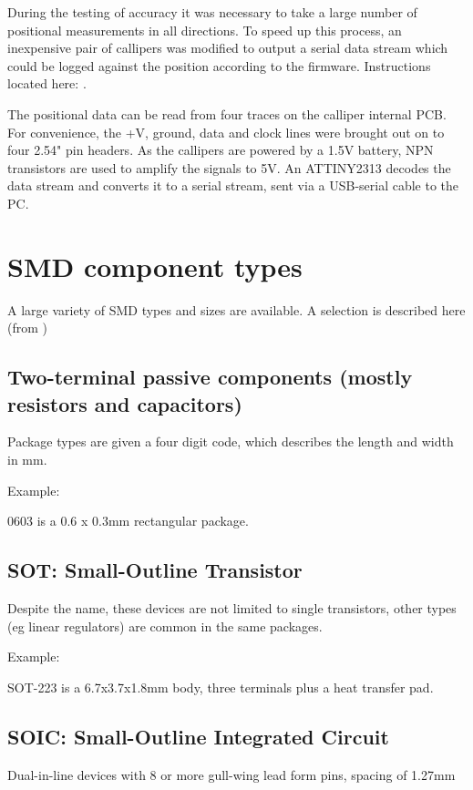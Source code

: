 During the testing of accuracy it was necessary to take a large number of positional measurements in all directions. 
To speed up this process, an inexpensive pair of callipers was modified to output a serial data stream which could be logged
against the position according to the firmware. Instructions located here: \cite{caliperdata}.

The positional data can be read from four traces on the calliper internal PCB. For convenience, the +V, ground, data and clock lines
were brought out on to four 2.54" pin headers. As the callipers are powered by a 1.5V battery, NPN transistors are used to amplify the signals to 5V. An ATTINY2313
decodes the data stream and converts it to a serial stream, sent via a USB-serial cable to the PC.

\newpage
\section{SMD component types}

A large variety of SMD types and sizes are available. A selection is described here (from \cite{smdwiki})

\subsection{Two-terminal passive components (mostly resistors and capacitors)}
Package types are given a four digit code, which describes the length and width in mm.

Example:

0603 is a 0.6 x 0.3mm rectangular package.

\subsection{SOT: Small-Outline Transistor}
Despite the name, these devices are not limited to single transistors, other types (eg linear regulators) are
common in the same packages.

Example:

SOT-223 is a 6.7x3.7x1.8mm body, three terminals plus a heat transfer pad.

\subsection{SOIC: Small-Outline Integrated Circuit}
Dual-in-line devices with 8 or more gull-wing lead form pins, spacing of 1.27mm

\newpage

